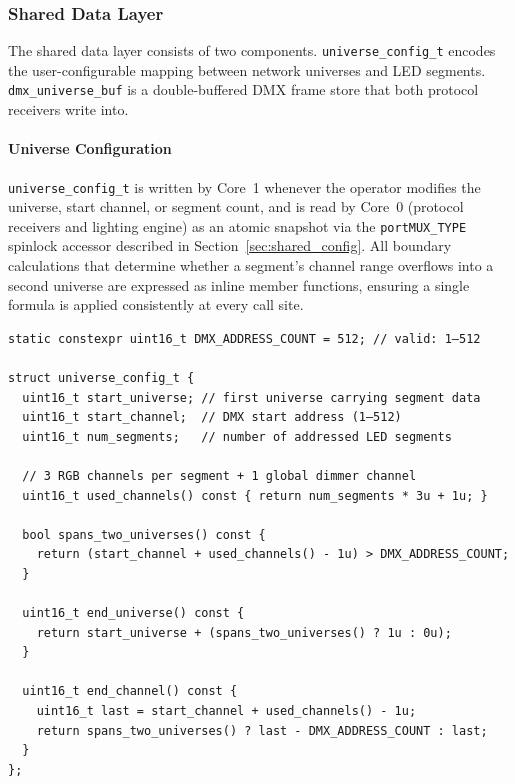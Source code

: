 \subsubsection{Shared Data Layer}
\label{sec:net_shared_data}

The shared data layer consists of two components.
\texttt{universe\_config\_t} encodes the user-configurable mapping between network universes and \ac{LED} segments.
\texttt{dmx\_universe\_buf} is a double-buffered \ac{DMX} frame store that both protocol receivers write into.

\paragraph{Universe Configuration}
\texttt{universe\_config\_t} is written by Core~1 whenever the operator modifies the universe, start channel, or segment count, and is read by Core~0 (protocol receivers and lighting engine) as an atomic snapshot via the \texttt{portMUX\_TYPE} spinlock accessor described in Section~\ref{sec:shared_config}.
All boundary calculations that determine whether a segment's channel range overflows into a second universe are expressed as inline member functions, ensuring a single formula is applied consistently at every call site.

\begin{longlisting}
\begin{verbatim}
static constexpr uint16_t DMX_ADDRESS_COUNT = 512; // valid: 1–512

struct universe_config_t {
  uint16_t start_universe; // first universe carrying segment data
  uint16_t start_channel;  // DMX start address (1–512)
  uint16_t num_segments;   // number of addressed LED segments

  // 3 RGB channels per segment + 1 global dimmer channel
  uint16_t used_channels() const { return num_segments * 3u + 1u; }

  bool spans_two_universes() const {
    return (start_channel + used_channels() - 1u) > DMX_ADDRESS_COUNT;
  }

  uint16_t end_universe() const {
    return start_universe + (spans_two_universes() ? 1u : 0u);
  }

  uint16_t end_channel() const {
    uint16_t last = start_channel + used_channels() - 1u;
    return spans_two_universes() ? last - DMX_ADDRESS_COUNT : last;
  }
};
\end{verbatim}
\caption{\texttt{universe\_config\_t}: universe mapping and boundary computation.}
\label{lst:universe_config}
\end{longlisting}

